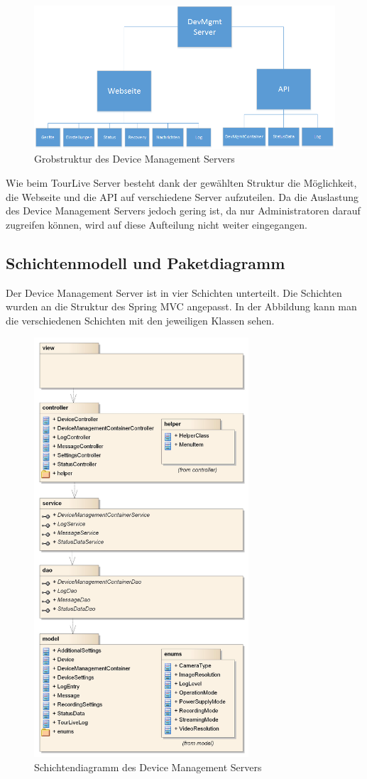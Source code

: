 \begin{figure}[H]
	\centering
	\includegraphics[width=120mm]{images/devmgmtsrv/uebersicht.png}
	\caption{Grobstruktur des Device Management Servers}
\end{figure}

Wie beim TourLive Server besteht dank der gewählten Struktur die Möglichkeit, die Webseite und die API auf verschiedene Server aufzuteilen. Da die Auslastung des Device Management Servers jedoch gering ist, da nur Administratoren darauf zugreifen können, wird auf diese Aufteilung nicht weiter eingegangen.

\subsection{Schichtenmodell und Paketdiagramm}
Der Device Management Server ist in vier Schichten unterteilt. Die Schichten wurden an die Struktur des Spring MVC angepasst. In der Abbildung kann man die verschiedenen Schichten mit den jeweiligen Klassen sehen.

\begin{figure}[H]
	\centering
	\includegraphics[width=80mm]{images/devmgmtsrv/schichten.jpg}
	\caption{Schichtendiagramm des Device Management Servers}
\end{figure}

